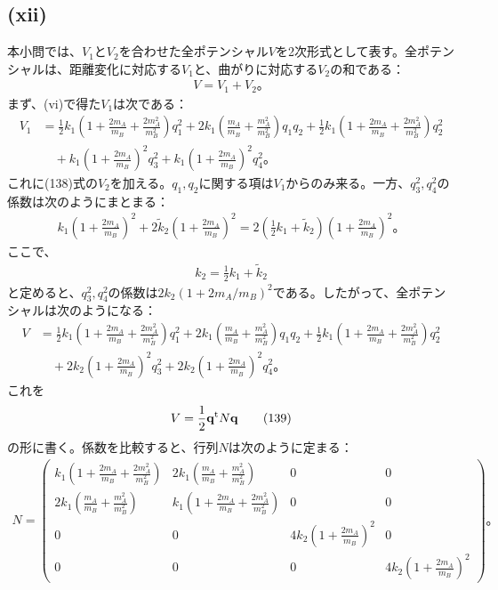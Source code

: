   \subsection*{(xii)}
  本小問では、$V_1$と$V_2$を合わせた全ポテンシャル$V$を2次形式として表す。全ポテンシャルは、距離変化に対応する$V_1$と、曲がりに対応する$V_2$の和である：
  \begin{align*}
    V=V_1+V_2。
  \end{align*}
  まず、(vi)で得た$V_1$は次である：
  \begin{align*}
    V_1
    &=
    \frac{1}{2}k_1\left(1+\frac{2m_A}{m_B}+\frac{2m_A^2}{m_B^2}\right)q_1^2
    +2k_1\left(\frac{m_A}{m_B}+\frac{m_A^2}{m_B^2}\right)q_1q_2
    +\frac{1}{2}k_1\left(1+\frac{2m_A}{m_B}+\frac{2m_A^2}{m_B^2}\right)q_2^2 \\
    &\quad
    +k_1\left(1+\frac{2m_A}{m_B}\right)^2q_3^2
    +k_1\left(1+\frac{2m_A}{m_B}\right)^2q_4^2。
  \end{align*}
  これに(138)式の$V_2$を加える。$q_1,q_2$に関する項は$V_1$からのみ来る。一方、$q_3^2,q_4^2$の係数は次のようにまとまる：
  \begin{align*}
    k_1\left(1+\frac{2m_A}{m_B}\right)^2+2\tilde{k}_2\left(1+\frac{2m_A}{m_B}\right)^2
    =
    2\left(\frac{1}{2}k_1+\tilde{k}_2\right)\left(1+\frac{2m_A}{m_B}\right)^2。
  \end{align*}
  ここで、
  \begin{align*}
    k_2=\frac{1}{2}k_1+\tilde{k}_2\tag{141}
  \end{align*}
  と定めると、$q_3^2,q_4^2$の係数は$2k_2(1+2m_A/m_B)^2$である。したがって、全ポテンシャルは次のようになる：
  \begin{align*}
    V
    &=
    \frac{1}{2}k_1\left(1+\frac{2m_A}{m_B}+\frac{2m_A^2}{m_B^2}\right)q_1^2
    +2k_1\left(\frac{m_A}{m_B}+\frac{m_A^2}{m_B^2}\right)q_1q_2
    +\frac{1}{2}k_1\left(1+\frac{2m_A}{m_B}+\frac{2m_A^2}{m_B^2}\right)q_2^2 \\
    &\quad
    +2k_2\left(1+\frac{2m_A}{m_B}\right)^2q_3^2
    +2k_2\left(1+\frac{2m_A}{m_B}\right)^2q_4^2。
  \end{align*}
  これを
  \begin{align*}
    V=\frac{1}{2}\boldsymbol{\mathrm{q}}^{\mathrm{t}}N\boldsymbol{\mathrm{q}}\tag{139}
  \end{align*}
  の形に書く。係数を比較すると、行列$N$は次のように定まる：
  \begin{align*}
    N=
    \begin{pmatrix}
      k_1\left(1+\frac{2m_A}{m_B}+\frac{2m_A^2}{m_B^2}\right) & 2k_1\left(\frac{m_A}{m_B}+\frac{m_A^2}{m_B^2}\right) & 0 & 0 \\
      2k_1\left(\frac{m_A}{m_B}+\frac{m_A^2}{m_B^2}\right) & k_1\left(1+\frac{2m_A}{m_B}+\frac{2m_A^2}{m_B^2}\right) & 0 & 0 \\
      0 & 0 & 4k_2\left(1+\frac{2m_A}{m_B}\right)^2 & 0 \\
      0 & 0 & 0 & 4k_2\left(1+\frac{2m_A}{m_B}\right)^2
    \end{pmatrix}。\tag{140}
  \end{align*}
  
